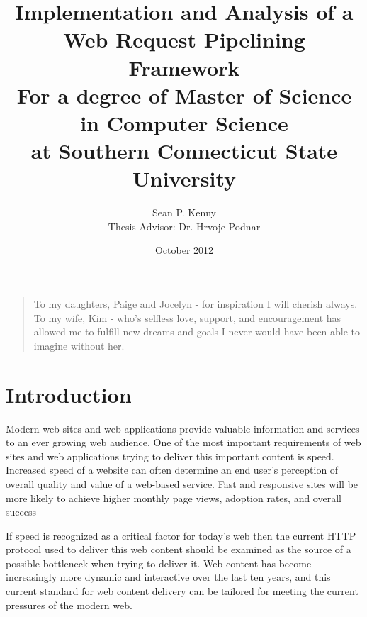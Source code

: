 \documentclass[12pt]{report}
\newenvironment{dedication}
	{\vspace{6ex}\begin{quotation}\begin{center}\begin{em}}
	{\par\end{em}\end{center}\end{quotation}}
\begin{document}
\title{
	Implementation and Analysis of a Web Request Pipelining Framework \\ 
	\footnotesize{
		For a degree of Master of Science in Computer Science \\ 
	 	at Southern Connecticut State University
	}
}
\date{October 2012}
\author{
	Sean P. Kenny \\ 
	Thesis Advisor: Dr. Hrvoje Podnar
}

\maketitle

\begin{dedication}
To my daughters, Paige and Jocelyn - for inspiration I will cherish always.
\linebreak\linebreak
To my wife, Kim - who’s selfless love, support, and encouragement has allowed me to fulfill new dreams and goals I never would have been able to imagine without her.
\end{dedication}

\tableofcontents
\listoffigures




\chapter{Introduction}

Modern web sites and web applications provide valuable information and services to an ever growing web audience. One of the most important requirements of web sites and web applications trying to deliver this important content is speed. Increased speed of a website can often determine an end user's perception of overall quality and value of a web-based service. Fast and responsive sites will be more likely to achieve higher monthly page views, adoption rates, and overall success

If speed is recognized as a critical factor for today's web then the current HTTP protocol used to deliver this web content should be examined as the source of a possible bottleneck when trying to deliver it. Web content has become increasingly more dynamic and interactive over the last ten years, and this current standard for web content delivery can be tailored for meeting the current pressures of the modern web.
\end{document}

